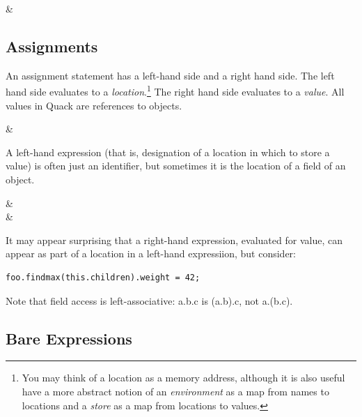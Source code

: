 \documentclass[11pt]{article}
\begin{document}
\begin{grammar}
 & 
    
\end{grammar}




\subsection{Assignments}

An assignment statement has a left-hand side and a right hand side.
The left hand side evaluates to a \emph{location}.\footnote{You may
  think of a location as a memory address, although it is also useful 
  have a more abstract notion of an \emph{environment} as a map from 
  names to locations and a \emph{store} as a map from locations 
  to values.}
The right hand side evaluates to a \emph{value}.  All values in Quack
are references to objects.  

\begin{grammar}
 & 
   \literal{=}  \StmtEnd
\end{grammar}

A left-hand expression (that is, designation of a location in which to
store a value) is often just an identifier, but sometimes it is the
location of a field of an object.  

\begin{grammar}
 & \\
 &
      \\
\end{grammar}

It may appear surprising that a right-hand expression, evaluated for
value, can appear as part of a location in a left-hand expressiion,
but consider: 

\begin{verbatim}
foo.findmax(this.children).weight = 42;
\end{verbatim}

Note that field access is left-associative:  a.b.c is (a.b).c, not
a.(b.c).  

\subsection{Bare Expressions}
\end{document}

